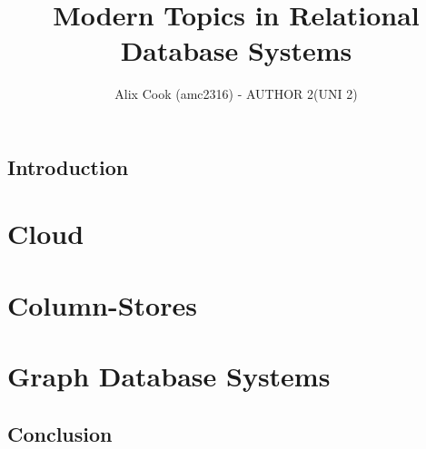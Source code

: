 \documentclass[11pt]{article}
\author{Alix Cook (amc2316) - AUTHOR 2(UNI 2)}
\title{Modern Topics in Relational Database Systems}
\begin{document}
\setlength{\parskip}{.1 in}

\maketitle
\newpage

\subsection*{Introduction}

%
%

\section*{Cloud}
 \newpage

\section*{Column-Stores}
 \newpage

\section*{Graph Database Systems}
 \newpage

\subsection*{Conclusion}
%
%


\end{document}
